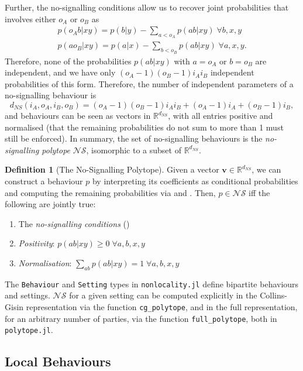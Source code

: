 \documentclass[10pt, a4paper]{article}
\numberwithin{equation}{section} %
\newcounter{stmt} %
\theoremstyle{definition}
\newtheorem{defn}[stmt]{Definition}
\theoremstyle{plain}
\newcommand{\?}{\mathrel{?}} %
\newcommand{\R}{\mathbb{R}} %
\newcommand{\cvec}[1]{\boldsymbol{\mathbf{#1}}}    %
\newcommand{\NSs}{\mathcal{NS}}
\begin{document}
    Further, the no-signalling conditions allow us to recover joint probabilities that involves either \(o_A\) or \(o_B\) as
    \begin{gather}
      p(o_A b|xy) = p(b|y) - \sum_{a < o_A} p(ab|xy)\;\forall b,x,y\label{eqn:cgtofullA} \\
      p(ao_B|xy) = p(a|x) - \sum_{b < o_B} p(ab|xy)\;\forall a,x,y.\label{eqn:cgtofullB}
    \end{gather}
    Therefore, none of the probabilities \(p(ab|xy)\) with \(a = o_A\) or \(b = o_B\) are independent, and we have only \((o_A-1)(o_B-1){i_A}{i_B}\) independent probabilities of this form. Therefore, the number of independent parameters of a no-signalling behaviour is
    \[ d_{NS}(i_A, o_A, i_B, o_B) = (o_A-1)(o_B-1){i_A}{i_B} + (o_A-1)i_A + (o_B-1)i_B, \]
    and behaviours can be seen as vectors in \(\R^{d_{NS}}\), with all entries positive and normalised (that the remaining probabilities do not sum to more than 1 must still be enforced). In summary, the set of no-signalling behaviours is the \emph{no-signalling polytope} \(\NSs\), isomorphic to a subset of \(\R^{d_{NS}}\).
    \begin{defn}[The No-Signalling Polytope]
      Given a vector \(\cvec{v} \in \R^{d_{NS}}\), we can construct a behaviour \(p\) by interpreting its coefficients as conditional probabilities and computing the remaining probabilities via  and . Then, \(p \in \NSs\) iff the following are jointly true:
      \begin{enumerate}
        \item The \emph{no-signalling conditions} ()
        \item \emph{Positivity}: \(p(ab|xy) \geq 0\;\forall a,b,x,y\) 
        \item \emph{Normalisation}: \(\sum_{ab} p(ab|xy) = 1\;\forall a,b,x,y\)
      \end{enumerate}
    \end{defn}

    The \verb`Behaviour` and \verb`Setting` types in \verb`nonlocality.jl` define bipartite behaviours and settings. \(\NSs\) for a given setting can be computed explicitly in the Collins-Gisin representation via the function \verb`cg_polytope`, and in the full representation, for an arbitrary number of parties, via the function \verb`full_polytope`, both in \verb`polytope.jl`.

    \subsection{Local Behaviours}
\end{document}
